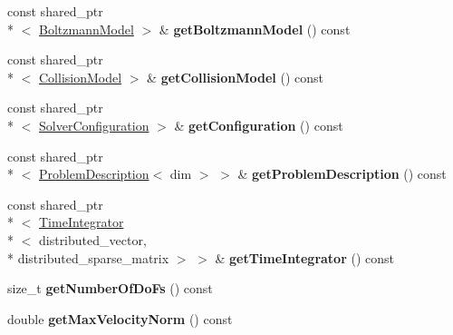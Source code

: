 \begin{DoxyCompactItemize}
\item 
\hypertarget{classnatrium_1_1CFDSolver_a3733dbd256b6d38659cee3cb044c1446}{const shared\-\_\-ptr\\*
$<$ \hyperlink{classnatrium_1_1BoltzmannModel}{Boltzmann\-Model} $>$ \& {\bfseries get\-Boltzmann\-Model} () const }\label{classnatrium_1_1CFDSolver_a3733dbd256b6d38659cee3cb044c1446}

\item 
\hypertarget{classnatrium_1_1CFDSolver_abb4b632b524bd68afcdff7d54c2d3d97}{const shared\-\_\-ptr\\*
$<$ \hyperlink{classnatrium_1_1CollisionModel}{Collision\-Model} $>$ \& {\bfseries get\-Collision\-Model} () const }\label{classnatrium_1_1CFDSolver_abb4b632b524bd68afcdff7d54c2d3d97}

\item 
\hypertarget{classnatrium_1_1CFDSolver_a413691491ac82f384a03293be2294de5}{const shared\-\_\-ptr\\*
$<$ \hyperlink{classnatrium_1_1SolverConfiguration}{Solver\-Configuration} $>$ \& {\bfseries get\-Configuration} () const }\label{classnatrium_1_1CFDSolver_a413691491ac82f384a03293be2294de5}

\item 
\hypertarget{classnatrium_1_1CFDSolver_a8b1131e8fd6b022bea5ddce72469c289}{const shared\-\_\-ptr\\*
$<$ \hyperlink{classnatrium_1_1ProblemDescription}{Problem\-Description}$<$ dim $>$ $>$ \& {\bfseries get\-Problem\-Description} () const }\label{classnatrium_1_1CFDSolver_a8b1131e8fd6b022bea5ddce72469c289}

\item 
\hypertarget{classnatrium_1_1CFDSolver_adc432b8516f531639914001616d36ab9}{const shared\-\_\-ptr\\*
$<$ \hyperlink{classnatrium_1_1TimeIntegrator}{Time\-Integrator}\\*
$<$ distributed\-\_\-vector, \\*
distributed\-\_\-sparse\-\_\-matrix $>$ $>$ \& {\bfseries get\-Time\-Integrator} () const }\label{classnatrium_1_1CFDSolver_adc432b8516f531639914001616d36ab9}

\item 
\hypertarget{classnatrium_1_1CFDSolver_a74d459ef4f43d42e04ceb2178bb006f4}{size\-\_\-t {\bfseries get\-Number\-Of\-Do\-Fs} () const }\label{classnatrium_1_1CFDSolver_a74d459ef4f43d42e04ceb2178bb006f4}

\item 
\hypertarget{classnatrium_1_1CFDSolver_ae9c44bb0f33e2c73ee96fbe100061842}{double {\bfseries get\-Max\-Velocity\-Norm} () const }\label{classnatrium_1_1CFDSolver_ae9c44bb0f33e2c73ee96fbe100061842}


\end{DoxyCompactItemize}
